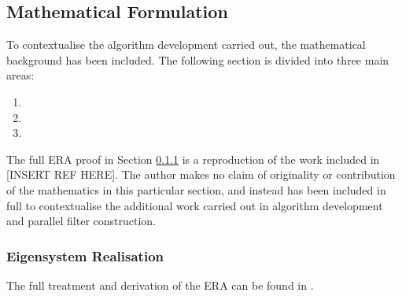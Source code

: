 \subsection{Mathematical Formulation}
\label{sec:maths}

To contextualise the algorithm development carried out, the mathematical background has been included. The following section is divided into three main areas:

\begin{enumerate}
    \item {}
    \item {}
    \item {}
\end{enumerate}

The full ERA proof in Section \ref{sec:era-proof} is a reproduction of the work included in [INSERT REF HERE]. The author makes no claim of originality or contribution of the mathematics in this particular section, and instead has been included in full to contextualise the additional work carried out in algorithm development and parallel filter construction.

\subsubsection{Eigensystem Realisation}
\label{sec:era-proof}

The full treatment and derivation of the ERA can be found in \cite{juang-1994-book}.


